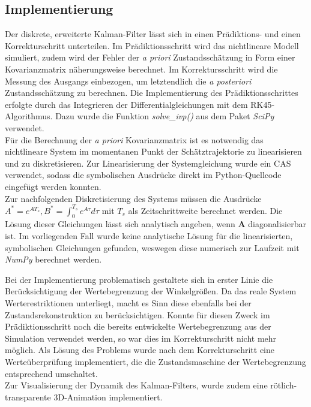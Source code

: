 \documentclass[times, 9pt,twocolumn]{article}
\begin{document}
	\subsection{Implementierung}
	Der diskrete, erweiterte Kalman-Filter lässt sich in einen Prädiktions- und einen Korrekturschritt unterteilen.  Im Prädiktionsschritt wird das nichtlineare Modell simuliert, zudem wird der Fehler der \textit{a priori} Zustandsschätzung in Form einer Kovarianzmatrix näherungsweise berechnet. Im Korrektursschritt wird die Messung des Ausgangs einbezogen, um letztendlich die \textit{a posteriori} Zustandsschätzung zu berechnen. Die Implementierung des Prädiktionsschrittes erfolgte durch das Integrieren der Differentialgleichungen mit dem RK45-Algorithmus. Dazu wurde die Funktion \textit{solve\_ivp()} aus dem Paket \textit{SciPy} verwendet. \\ Für die Berechnung der \textit{a priori} Kovarianzmatrix ist es notwendig das nichtlineare System im momentanen Punkt der Schätztrajektorie zu linearisieren und zu diskretisieren. Zur Linearisierung der Systemgleichung wurde ein CAS verwendet, sodass die symbolischen Ausdrücke direkt im Python-Quellcode eingefügt werden konnten. \\ Zur nachfolgenden Diskretisierung des Systems müssen die Ausdrücke $A^* = e^{A T_s}, B^* = \int_{0}^{T_s} e^{A \tau} d\tau$ mit $T_s$ als Zeitschrittweite berechnet werden. 
	Die Lösung dieser Gleichungen lässt sich analytisch angeben, wenn $\bm A$	diagonalisierbar ist. Im vorliegenden Fall wurde keine analytische Lösung für die linearisierten, symbolischen Gleichungen gefunden, weswegen diese numerisch zur Laufzeit mit \textit{NumPy} berechnet werden. \\

	Bei der Implementierung problematisch gestaltete sich in erster Linie die Berücksichtigung der Wertebegrenzung der Winkelgrößen. Da das reale System Werterestriktionen unterliegt, macht es Sinn diese ebenfalls bei der Zustandsrekonstruktion zu berücksichtigen. Konnte für diesen Zweck im Prädiktionsschritt noch die bereits entwickelte Wertebegrenzung aus der Simulation verwendet werden, so war dies im Korrekturschritt nicht mehr möglich. Als Lösung des Problems wurde nach dem Korrekturschritt eine Werteüberprüfung implementiert, die die Zustandsmaschine der Wertebegrenzung entsprechend umschaltet. \\
	Zur Visualisierung der Dynamik des Kalman-Filters, wurde zudem eine rötlich-transparente 3D-Animation implementiert.
	
\end{document}
